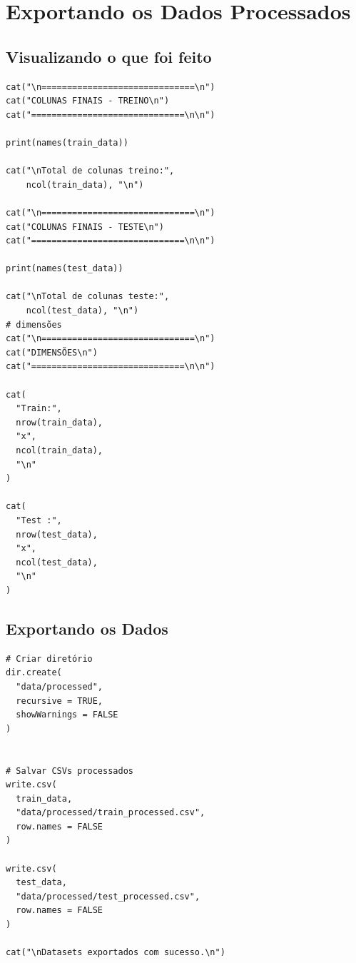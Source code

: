 \documentclass[12pt,a4paper]{article}
\begin{document}
\section{Exportando os Dados Processados}
\label{sec:org9f00e8d}
\subsection{Visualizando o que foi feito}
\label{sec:org0cda848}
\begin{verbatim}
cat("\n==============================\n")
cat("COLUNAS FINAIS - TREINO\n")
cat("==============================\n\n")

print(names(train_data))

cat("\nTotal de colunas treino:",
    ncol(train_data), "\n")

cat("\n==============================\n")
cat("COLUNAS FINAIS - TESTE\n")
cat("==============================\n\n")

print(names(test_data))

cat("\nTotal de colunas teste:",
    ncol(test_data), "\n")
# dimensões
cat("\n==============================\n")
cat("DIMENSÕES\n")
cat("==============================\n\n")

cat(
  "Train:",
  nrow(train_data),
  "x",
  ncol(train_data),
  "\n"
)

cat(
  "Test :",
  nrow(test_data),
  "x",
  ncol(test_data),
  "\n"
)
\end{verbatim}
\subsection{Exportando os Dados}
\label{sec:orgf0ce3a1}
\begin{verbatim}
# Criar diretório
dir.create(
  "data/processed",
  recursive = TRUE,
  showWarnings = FALSE
)


# Salvar CSVs processados
write.csv(
  train_data,
  "data/processed/train_processed.csv",
  row.names = FALSE
)

write.csv(
  test_data,
  "data/processed/test_processed.csv",
  row.names = FALSE
)

cat("\nDatasets exportados com sucesso.\n")
\end{verbatim}
\end{document}
